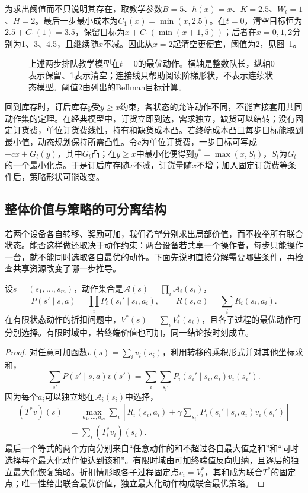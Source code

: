 为求出阈值而不只说明其存在，取教学参数$B=5$、$h(x)=x$、$K=2.5$、$W_t=1$、$H=2$。最后一步最小成本为$C_1(x)=\min(x,2.5)$。在$t=0$，清空目标恒为$2.5+C_1(1)=3.5$，保留目标为$x+C_1(\min(x+1,5))$；后者在$x=0,1,2$分别为1、3、4.5，且继续随$x$不减。因此从$x=2$起清空更便宜，阈值为2，见图~\ref{fig:rl-planning-threshold}。

\begin{figure}[htbp]
 \centering
 
 \caption{上述两步排队教学模型在$t=0$的最优动作。横轴是整数队长，纵轴0表示保留、1表示清空；连接线只帮助阅读阶梯形状，不表示连续状态模型。阈值2由列出的Bellman目标计算。}
 \label{fig:rl-planning-threshold}
\end{figure}

回到库存时，订后库存$y$受$y\geq x$约束，各状态的允许动作不同，不能直接套用共同动作集的定理。在经典模型中，订货立即到达，需求独立，缺货可以结转；没有固定订货费，单位订货费线性，持有和缺货成本凸。若终端成本凸且每步目标能取到最小值，动态规划保持所需凸性。令$c$为单位订货费，一步目标可写成$-cx+G_t(y)$，其中$G_t$凸；在$y\geq x$中最小化便得到$y^*=\max(x,S_t)$，$S_t$为$G_t$的一个最小化点。于是订后库存随$x$不减，订货量随$x$不增；加入固定订货费等条件后，策略形状可能改变。

\subsection{整体价值与策略的可分离结构}
\label{sec:rl-planning-separable}

若两个设备各自转移、奖励可加，我们希望分别求出局部价值，而不枚举所有联合状态。能否这样做还取决于动作约束：两台设备若共享一个操作者，每步只能操作一台，就不能同时选取各自最优的动作。下面先说明直接分解需要哪些条件，再检查共享资源改变了哪一步推导。

\begin{theorem}[独立子过程的可分离性]
 \label{thm:rl-planning-separable}
 设$s=(s_1,\ldots,s_m)$，动作集合是$\mathcal A(s)=\prod_i\mathcal A_i(s_i)$，
 \[
 P(s'\mid s,a)=\prod_iP_i(s_i'\mid s_i,a_i),\qquad
 R(s,a)=\sum_iR_i(s_i,a_i).
 \]
 在有限状态动作的折扣问题中，$V^*(s)=\sum_iV_i^*(s_i)$，且各子过程的最优动作可分别选择。有限时域中，若终端价值也可加，同一结论按时刻成立。
\end{theorem}
\begin{proof}
 对任意可加函数$v(s)=\sum_i v_i(s_i)$，利用转移的乘积形式并对其他坐标求和，
 \[
 \sum_{s'}P(s'\mid s,a)v(s')
 =\sum_i\sum_{s_i'}P_i(s_i'\mid s_i,a_i)v_i(s_i').
 \]
 因为每个$a_i$可以独立地在$\mathcal A_i(s_i)$中选择，
 \[
 \begin{aligned}
 (T^*v)(s)
 &=\max_{a_1,\ldots,a_m}\sum_i
   \left[R_i(s_i,a_i)+\gamma\sum_{s_i'}P_i(s_i'\mid s_i,a_i)v_i(s_i')\right]\\
 &=\sum_i(T_i^*v_i)(s_i).
 \end{aligned}
 \]
 最后一个等式的两个方向分别来自“任意动作的和不超过各自最大值之和”和“同时选择每个最大化动作便达到该和”。有限时域由可加终端值反向归纳，且逐层的独立最大化恢复策略。折扣情形取各子过程固定点$v_i=V_i^*$，其和成为联合$T^*$的固定点；唯一性给出联合最优价值，独立最大化动作构成联合最优策略。
\end{proof}

